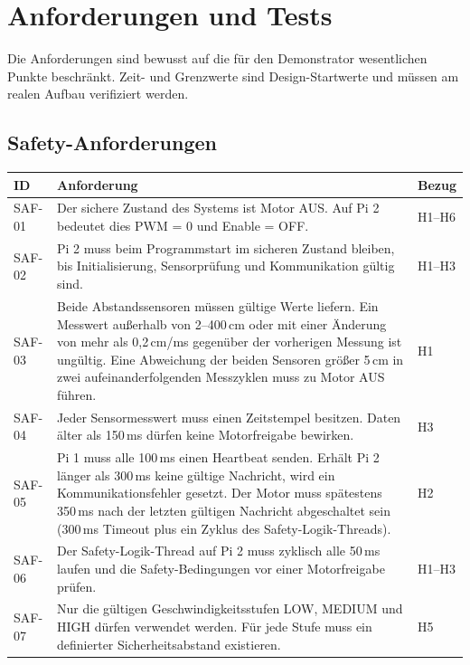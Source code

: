 \clearpage
\section{Anforderungen und Tests}
\label{sec:requirements}

Die Anforderungen sind bewusst auf die für den Demonstrator wesentlichen
Punkte beschränkt. Zeit- und Grenzwerte sind Design-Startwerte und müssen am
realen Aufbau verifiziert werden.

\subsection{Safety-Anforderungen}

\begin{table}[H]
    \centering
    \small
    \begin{tabularx}{\textwidth}{@{}p{1.5cm}Yp{2.0cm}@{}}
        \toprule
        \textbf{ID} & \textbf{Anforderung} & \textbf{Bezug} \\
        \midrule
        SAF-01 & Der sichere Zustand des Systems ist Motor AUS. Auf Pi 2 bedeutet dies PWM = 0 und Enable = OFF. & H1--H6 \\
        SAF-02 & Pi 2 muss beim Programmstart im sicheren Zustand bleiben, bis Initialisierung, Sensorprüfung und Kommunikation gültig sind. & H1--H3 \\
        SAF-03 & Beide Abstandssensoren müssen gültige Werte liefern. Ein Messwert außerhalb von 2--400\,cm oder mit einer Änderung von mehr als 0{,}2\,cm/ms gegenüber der vorherigen Messung ist ungültig. Eine Abweichung der beiden Sensoren größer 5\,cm in zwei aufeinanderfolgenden Messzyklen muss zu Motor AUS führen. & H1 \\
        SAF-04 & Jeder Sensormesswert muss einen Zeitstempel besitzen. Daten älter als 150\,ms dürfen keine Motorfreigabe bewirken. & H3 \\
        SAF-05 & Pi 1 muss alle 100\,ms einen Heartbeat senden. Erhält Pi 2 länger als 300\,ms keine gültige Nachricht, wird ein Kommunikationsfehler gesetzt. Der Motor muss spätestens 350\,ms nach der letzten gültigen Nachricht abgeschaltet sein (300\,ms Timeout plus ein Zyklus des Safety-Logik-Threads). & H2 \\        
        SAF-06 & Der Safety-Logik-Thread auf Pi 2 muss zyklisch alle 50\,ms laufen und die Safety-Bedingungen vor einer Motorfreigabe prüfen. & H1--H3 \\
        SAF-07 & Nur die gültigen Geschwindigkeitsstufen LOW, MEDIUM und HIGH dürfen verwendet werden. Für jede Stufe muss ein definierter Sicherheitsabstand existieren. & H5 \\

\end{tabularx}
\end{table}
